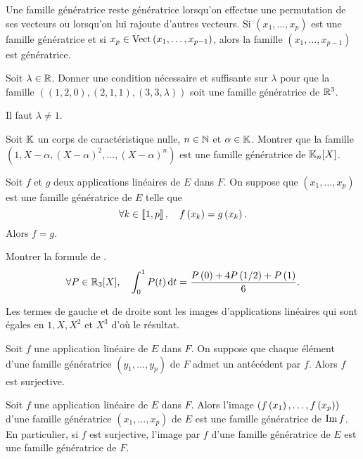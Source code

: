 \documentclass{magnolia}
\begin{document}
\begin{remarques}
\remarque Une famille génératrice reste génératrice lorsqu'on effectue une
  permutation de ses vecteurs ou lorsqu'on lui rajoute d'autres vecteurs.
\remarque Si $(x_1,\ldots,x_p)$ est une famille génératrice et si
  $x_p\in\operatorname{Vect}\left(x_1,\ldots,x_{p-1}\right)$, alors la famille $(x_1,\ldots,x_{p-1})$ est
  génératrice.
\end{remarques}


\begin{exos}
  \exo Soit $\lambda\in\mathbb{R}$. Donner une condition nécessaire et suffisante sur
    $\lambda$ pour que la famille $((1,2,0), (2,1,1), (3,3,\lambda))$
    soit une famille génératrice de $\mathbb{R}^3$.
    \begin{sol}
    Il faut $\lambda\neq 1$.
    \end{sol}
  \exo Soit $\mathbb{K}$ un corps de caractéristique nulle, $n\in\mathbb{N}$ et $\alpha\in\mathbb{K}$. Montrer que la famille
    $(1,X-\alpha,(X-\alpha)^2,\ldots,(X-\alpha)^n)$ est une famille génératrice de $\polyK[n]$.
  \end{exos}


\begin{proposition}[utile=-2]
Soit $f$ et $g$ deux applications linéaires de $E$ dans $F$. On suppose que
$(x_1,\ldots,x_p)$ est une famille génératrice de $E$ telle que
\[\forall k\in\left\llbracket 1,p\right\rrbracket ,\quad f\left(x_k\right)=g\left(x_k\right).\]
Alors $f=g$.
\end{proposition}
  
\begin{exoUnique}
\exo Montrer la formule de .
  \[\forall P\in\polyR[3] \qsep \integ{0}{1}{P(t)}{t}=
    \frac{P\p{0}+4P\p{1/2}+P\p{1}}{6}.\]
    \begin{sol}
    Les termes de gauche et de droite sont les images d'applications linéaires qui sont égales en $1, X, X^2$ et $X^3$ d'où le résultat.
    \end{sol}
\end{exoUnique}

\begin{proposition}[utile=-2]
Soit $f$ une application linéaire de $E$ dans $F$. On suppose que chaque
élément d'une famille génératrice $(y_1,\ldots,y_p)$ de $F$ admet un
antécédent par $f$. Alors $f$ est surjective.
\end{proposition}

\begin{proposition}[utile=-2]
Soit $f$ une application linéaire de $E$ dans $F$. Alors l'image
$(f\left(x_1\right),\ldots,f\left(x_p\right))$ d'une famille génératrice $(x_1,\ldots,x_p)$ de $E$ est
une famille génératrice de $\operatorname{Im} f$.
En particulier, si $f$ est surjective, l'image par $f$
d'une famille génératrice de $E$ est une famille génératrice de $F$.
\end{proposition}
\end{document}
